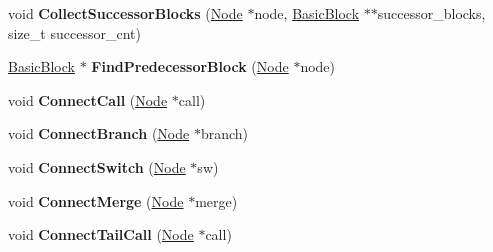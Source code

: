 \begin{DoxyCompactItemize}
\item 
void {\bfseries Collect\+Successor\+Blocks} (\hyperlink{classv8_1_1internal_1_1compiler_1_1_node}{Node} $\ast$node, \hyperlink{classv8_1_1internal_1_1compiler_1_1_basic_block}{Basic\+Block} $\ast$$\ast$successor\+\_\+blocks, size\+\_\+t successor\+\_\+cnt)\hypertarget{classv8_1_1internal_1_1compiler_1_1_c_f_g_builder_aa06a0e088cfd9392eb99094e58a02d60}{}\label{classv8_1_1internal_1_1compiler_1_1_c_f_g_builder_aa06a0e088cfd9392eb99094e58a02d60}

\item 
\hyperlink{classv8_1_1internal_1_1compiler_1_1_basic_block}{Basic\+Block} $\ast$ {\bfseries Find\+Predecessor\+Block} (\hyperlink{classv8_1_1internal_1_1compiler_1_1_node}{Node} $\ast$node)\hypertarget{classv8_1_1internal_1_1compiler_1_1_c_f_g_builder_a8b1e2d034d5a9f9f21f7e1aa496eaed6}{}\label{classv8_1_1internal_1_1compiler_1_1_c_f_g_builder_a8b1e2d034d5a9f9f21f7e1aa496eaed6}

\item 
void {\bfseries Connect\+Call} (\hyperlink{classv8_1_1internal_1_1compiler_1_1_node}{Node} $\ast$call)\hypertarget{classv8_1_1internal_1_1compiler_1_1_c_f_g_builder_aad29b1ffbafd2401950ec3f5affc0876}{}\label{classv8_1_1internal_1_1compiler_1_1_c_f_g_builder_aad29b1ffbafd2401950ec3f5affc0876}

\item 
void {\bfseries Connect\+Branch} (\hyperlink{classv8_1_1internal_1_1compiler_1_1_node}{Node} $\ast$branch)\hypertarget{classv8_1_1internal_1_1compiler_1_1_c_f_g_builder_aef2220bbd479ff2d84aaddbd1e981187}{}\label{classv8_1_1internal_1_1compiler_1_1_c_f_g_builder_aef2220bbd479ff2d84aaddbd1e981187}

\item 
void {\bfseries Connect\+Switch} (\hyperlink{classv8_1_1internal_1_1compiler_1_1_node}{Node} $\ast$sw)\hypertarget{classv8_1_1internal_1_1compiler_1_1_c_f_g_builder_af7d0ad13e55c1334fa66dec97fc38c6e}{}\label{classv8_1_1internal_1_1compiler_1_1_c_f_g_builder_af7d0ad13e55c1334fa66dec97fc38c6e}

\item 
void {\bfseries Connect\+Merge} (\hyperlink{classv8_1_1internal_1_1compiler_1_1_node}{Node} $\ast$merge)\hypertarget{classv8_1_1internal_1_1compiler_1_1_c_f_g_builder_acadcbbf948a0fca93b1814442250b552}{}\label{classv8_1_1internal_1_1compiler_1_1_c_f_g_builder_acadcbbf948a0fca93b1814442250b552}

\item 
void {\bfseries Connect\+Tail\+Call} (\hyperlink{classv8_1_1internal_1_1compiler_1_1_node}{Node} $\ast$call)\hypertarget{classv8_1_1internal_1_1compiler_1_1_c_f_g_builder_ae7d627a529e854256ca823a92fab318f}{}\label{classv8_1_1internal_1_1compiler_1_1_c_f_g_builder_ae7d627a529e854256ca823a92fab318f}


\end{DoxyCompactItemize}
